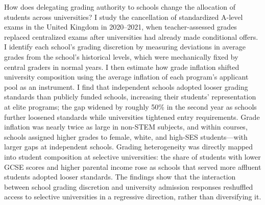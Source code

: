 How does delegating grading authority to schools change the allocation of students across universities? I study the cancellation of standardized A-level exams in the United Kingdom in 2020--2021, when teacher-assessed grades replaced centralized exams after universities had already made conditional offers. I identify each school's grading discretion by measuring deviations in average grades from the school's historical levels, which were mechanically fixed by central graders in normal years. I then estimate how grade inflation shifted university composition using the average inflation of each program's applicant pool as an instrument. I find that independent schools adopted looser grading standards than publicly funded schools, increasing their students' representation at elite programs; the gap widened by roughly 50\% in the second year as schools further loosened standards while universities tightened entry requirements. Grade inflation was nearly twice as large in non-STEM subjects, and within courses, schools assigned higher grades to female, white, and high-SES students---with larger gaps at independent schools. Grading heterogeneity was directly mapped into student composition at selective universities: the share of students with lower GCSE scores and higher parental income rose as schools that served more affluent students adopted looser standards. The findings show that the interaction between school grading discretion and university admission responses reshuffled access to selective universities in a regressive direction, rather than diversifying it.
